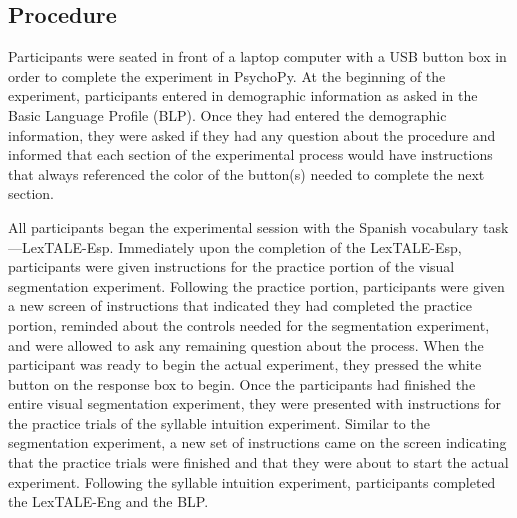 

\subsection{Procedure}
Participants were seated in front of a laptop computer with a USB button box in order to complete the experiment in PsychoPy. At the beginning of the experiment, participants entered in demographic information as asked in the Basic Language Profile (BLP). Once they had entered the demographic information, they were asked if they had any question about the procedure and informed that each section of the experimental process would have instructions that always referenced the color of the button(s) needed to complete the next section.

All participants began the experimental session with the Spanish vocabulary task---LexTALE-Esp. %
Immediately upon the completion of the LexTALE-Esp, participants were given instructions for the practice portion of the visual segmentation experiment. Following the practice portion, participants were given a new screen of instructions that indicated they had completed the practice portion, reminded about the controls needed for the segmentation experiment, and were allowed to ask any remaining question about the process. When the participant was ready to begin the actual experiment, they pressed the white button on the response box to begin. Once the participants had finished the entire visual segmentation experiment, they were presented with instructions for the practice trials of the syllable intuition experiment. Similar to the segmentation experiment, a new set of instructions came on the screen indicating that the practice trials were finished and that they were about to start the actual experiment. Following the syllable intuition experiment, participants completed the LexTALE-Eng and the BLP.

